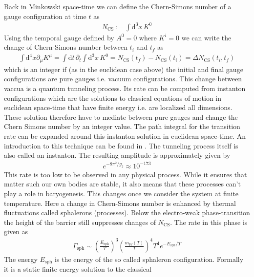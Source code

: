 \documentclass[13pt,a4paper,twoside,titlepage]{article}
\begin{document}
\noindent
Back in Minkowski space-time we can define the Chern-Simons number of a gauge configuration at time $t$ as \cite[eq. 23]{Dine_2003_Bayrogenesis}
\begin{align}
    N_{\mathrm{CS}} := \int \mathrm{d}^3 x \, K^0
\end{align}
Using the temporal gauge \cite{temporal_gauge_10.1007/BFb0015141} defined by $A^0 = 0$ where $K^i = 0$ we can
write the change of Chern-Simons number between $t_i$ and $t_f$ as
\begin{align}
    \int \mathrm{d}^4 x \partial_\mu K^\mu = \int \mathrm{d} t \, \partial_t \int \mathrm{d}^3 x \, K^0 =
    N_{\mathrm{CS}}(t_f) - N_{\mathrm{CS}}(t_i) = \Delta N_{\mathrm{CS}}(t_i, t_f)
\end{align}
which is an integer if (as in the euclidean case above) the initial and final gauge configurations are pure gauges i.e. vacuum configurations.
This change between vaccua is a quantum tunneling process. Its rate can be computed from instanton configurations which are the solutions to classical equations of motion in euclidean space-time that have finite energy i.e. are localized all dimensions. These solution therefore have to mediate between pure  gauges and change the Chern Simons number by an integer value.
The path integral for the transition rate can be expanded around this instanton solution in euclidean space-time. An introduction to this technique can be found in \cite[Chap. 7]{aspects_of_symmmetry}. The tunneling process itself is also called an instanton.
The resulting amplitude is approximately given by \cite[4.8]{Cline:2006ts_Baryogenesis}
\begin{align}
    e^{-8 \pi^2 / g_2} \approx 10^{-173}
\end{align}
This rate is too low to be observed in any physical process. While it ensures
that matter such our own bodies are stable, it also means that these processes
can't play a role in baryogenesis.
This changes once we consider the system at finite temperature.
Here a change in Chern-Simons number is enhanced by thermal fluctuations called  sphalerons (processes).
Below the electro-weak phase-transition the height of the barrier still
suppresses changes of $N_{\mathrm{CS}}$.
The rate in this phase is given as \cite[eq. 4.10]{Cline:2006ts_Baryogenesis}
\begin{align}
    \Gamma_{\mathrm{sph}} \sim \left( \frac{E_{\mathrm{sph}}}{T} \right)^3 \left( \frac{m_W(T)}{T} \right)^4 T^4 e^{- E_{\mathrm{sph}} / T}
\end{align}
The energy $E_{\mathrm{sph}}$ is the energy of the so called sphaleron configuration. Formally it is a static finite energy solution to the classical
\end{document}
